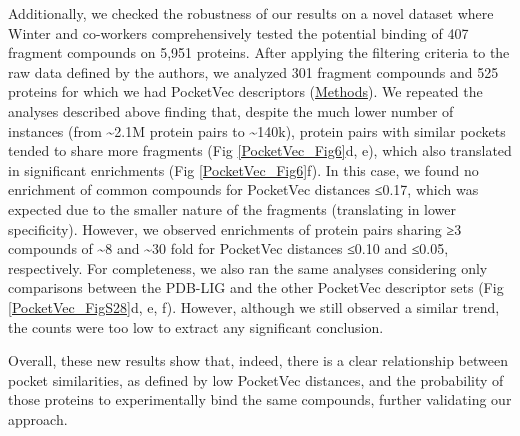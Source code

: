 Additionally, we checked the robustness of our results on a novel dataset where Winter and co-workers comprehensively tested the potential binding of 407 fragment compounds on 5,951 proteins. After applying the filtering criteria to the raw data defined by the authors, we analyzed 301 fragment compounds and 525 proteins for which we had PocketVec descriptors (\hyperref[PocketVec_Methods]{Methods}). We repeated the analyses described above finding that, despite the much lower number of instances (from \textasciitilde2.1M protein pairs to \textasciitilde140k), protein pairs with similar pockets tended to share more fragments (Fig \ref{PocketVec_Fig6}d, e), which also translated in significant enrichments (Fig \ref{PocketVec_Fig6}f). In this case, we found no enrichment of common compounds for PocketVec distances ≤0.17, which was expected due to the smaller nature of the fragments (translating in lower specificity). However, we observed enrichments of protein pairs sharing ≥3 compounds of \textasciitilde8 and \textasciitilde30 fold for PocketVec distances ≤0.10 and ≤0.05, respectively. For completeness, we also ran the same analyses considering only comparisons between the PDB-LIG and the other PocketVec descriptor sets (Fig \ref{PocketVec_FigS28}d, e, f). However, although we still observed a similar trend, the counts were too low to extract any significant conclusion.

Overall, these new results show that, indeed, there is a clear relationship between pocket similarities, as defined by low PocketVec distances, and the probability of those proteins to experimentally bind the same compounds, further validating our approach.




